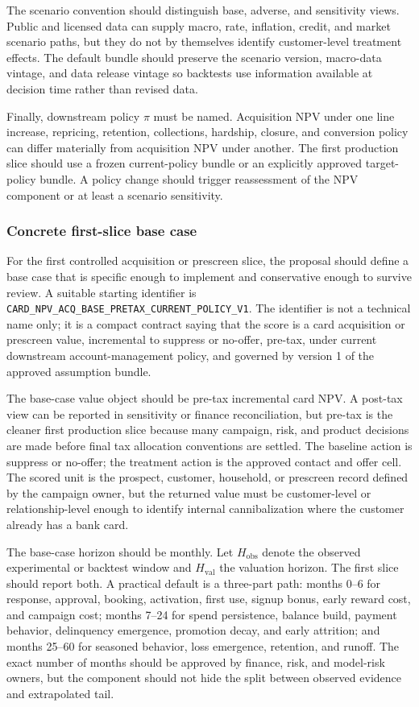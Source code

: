 \documentclass[11pt]{article}
\newcommand{\1}{\mathbf{1}}
\newcommand{\code}[1]{\nolinkurl{#1}}
\begin{document}
The scenario convention should distinguish base, adverse, and sensitivity
views. Public and licensed data can supply macro, rate, inflation, credit, and
market scenario paths, but they do not by themselves identify customer-level
treatment effects. The default bundle should preserve the scenario version,
macro-data vintage, and data release vintage so backtests use information
available at decision time rather than revised data.

Finally, downstream policy $\pi$ must be named. Acquisition NPV under one line
increase, repricing, retention, collections, hardship, closure, and conversion
policy can differ materially from acquisition NPV under another. The first
production slice should use a frozen current-policy bundle or an explicitly
approved target-policy bundle. A policy change should trigger reassessment of
the NPV component or at least a scenario sensitivity.

\subsubsection{Concrete first-slice base case}
\label{subsec:first-slice-valuation-base}

For the first controlled acquisition or prescreen slice, the proposal should
define a base case that is specific enough to implement and conservative
enough to survive review. A suitable starting identifier is
\code{CARD_NPV_ACQ_BASE_PRETAX_CURRENT_POLICY_V1}. The identifier is not a
technical name only; it is a compact contract saying that the score is a card
acquisition or prescreen value, incremental to suppress or no-offer, pre-tax,
under current downstream account-management policy, and governed by version 1
of the approved assumption bundle.

The base-case value object should be pre-tax incremental card NPV. A post-tax
view can be reported in sensitivity or finance reconciliation, but pre-tax is
the cleaner first production slice because many campaign, risk, and product
decisions are made before final tax allocation conventions are settled. The
baseline action is suppress or no-offer; the treatment action is the approved
contact and offer cell. The scored unit is the prospect, customer, household,
or prescreen record defined by the campaign owner, but the returned value must
be customer-level or relationship-level enough to identify internal
cannibalization where the customer already has a bank card.

The base-case horizon should be monthly. Let $H_{\mathrm{obs}}$ denote the
observed experimental or backtest window and $H_{\mathrm{val}}$ the valuation
horizon. The first slice should report both. A practical default is a
three-part path: months 0--6 for response, approval, booking, activation,
first use, signup bonus, early reward cost, and campaign cost; months 7--24
for spend persistence, balance build, payment behavior, delinquency emergence,
promotion decay, and early attrition; and months 25--60 for seasoned behavior,
loss emergence, retention, and runoff. The exact number of months should be
approved by finance, risk, and model-risk owners, but the component should not
hide the split between observed evidence and extrapolated tail.
\end{document}
